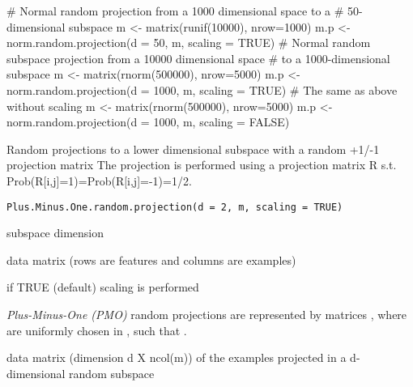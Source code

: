 \documentclass{article}
\begin{document}
\begin{Examples}
\begin{ExampleCode}
# Normal random projection from a 1000 dimensional space to a 
# 50-dimensional subspace
m <- matrix(runif(10000), nrow=1000)
m.p <- norm.random.projection(d = 50, m, scaling = TRUE)
# Normal random subspace projection from a 10000 dimensional space 
# to a 1000-dimensional subspace
m <- matrix(rnorm(500000), nrow=5000)
m.p <- norm.random.projection(d = 1000, m, scaling = TRUE)
# The same as above without scaling
m <- matrix(rnorm(500000), nrow=5000)
m.p <- norm.random.projection(d = 1000, m, scaling = FALSE)
\end{ExampleCode}
\end{Examples}

\begin{Description}\relax
Random projections to a lower dimensional subspace with a random +1/-1 projection matrix
The projection is performed using a  projection matrix R s.t. Prob(R[i,j]=1)=Prob(R[i,j]=-1)=1/2.
\end{Description}
\begin{Usage}
\begin{verbatim}
Plus.Minus.One.random.projection(d = 2, m, scaling = TRUE)
\end{verbatim}
\end{Usage}
\begin{Arguments}
\begin{ldescription}
\item[\code{d}] subspace dimension 
\item[\code{m}] data matrix (rows are features and columns are examples) 
\item[\code{scaling}] if TRUE (default) scaling is performed 
\end{ldescription}
\end{Arguments}
\begin{Details}\relax
\emph{Plus-Minus-One (PMO)} random projections are 
represented by  matrices , where  
are uniformly chosen in , such that .
\end{Details}
\begin{Value}
data matrix (dimension d X ncol(m)) of the examples projected in a d-dimensional random subspace
\end{Value}
\end{document}
